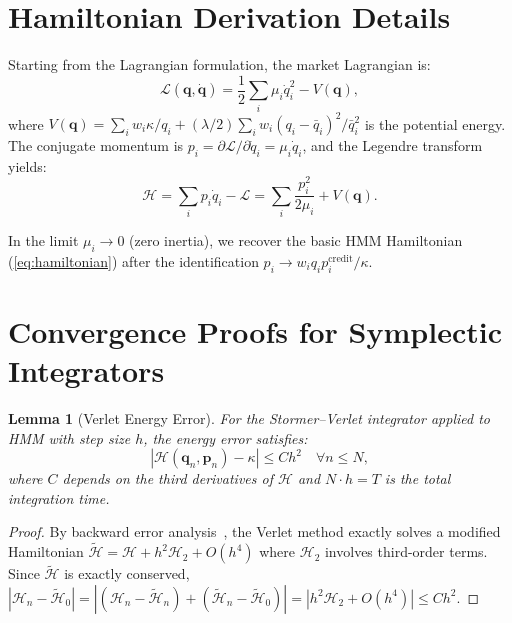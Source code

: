 \documentclass[11pt,twocolumn]{article}
\newtheorem{lemma}[theorem]{Lemma}
\begin{document}
\section{Hamiltonian Derivation Details}
\label{app:derivation}

Starting from the Lagrangian formulation, the market Lagrangian is:
\begin{equation}
\mathcal{L}(\bm{q}, \dot{\bm{q}}) = \frac{1}{2}\sum_i \mu_i \dot{q}_i^2 - V(\bm{q}),
\end{equation}
where $V(\bm{q}) = \sum_i w_i \kappa / q_i + (\lambda/2)\sum_i w_i(q_i - \bar{q}_i)^2/\bar{q}_i^2$ is the potential energy. The conjugate momentum is $p_i = \partial\mathcal{L}/\partial\dot{q}_i = \mu_i\dot{q}_i$, and the Legendre transform yields:
\begin{equation}
\mathcal{H} = \sum_i p_i\dot{q}_i - \mathcal{L} = \sum_i \frac{p_i^2}{2\mu_i} + V(\bm{q}).
\end{equation}

In the limit $\mu_i \to 0$ (zero inertia), we recover the basic HMM Hamiltonian (\ref{eq:hamiltonian}) after the identification $p_i \to w_i q_i p_i^{\text{credit}} / \kappa$.

\section{Convergence Proofs for Symplectic Integrators}
\label{app:convergence}

\begin{lemma}[Verlet Energy Error]
For the Stormer--Verlet integrator applied to HMM with step size $h$, the energy error satisfies:
\begin{equation}
|\mathcal{H}(\bm{q}_n, \bm{p}_n) - \kappa| \le C h^2 \quad \forall n \le N,
\end{equation}
where $C$ depends on the third derivatives of $\mathcal{H}$ and $N \cdot h = T$ is the total integration time.
\end{lemma}

\begin{proof}
By backward error analysis~\cite{hairer2006geometric}, the Verlet method exactly solves a modified Hamiltonian $\tilde{\mathcal{H}} = \mathcal{H} + h^2\mathcal{H}_2 + O(h^4)$ where $\mathcal{H}_2$ involves third-order terms. Since $\tilde{\mathcal{H}}$ is exactly conserved, $|\mathcal{H}_n - \tilde{\mathcal{H}}_0| = |(\mathcal{H}_n - \tilde{\mathcal{H}}_n) + (\tilde{\mathcal{H}}_n - \tilde{\mathcal{H}}_0)| = |h^2\mathcal{H}_2 + O(h^4)| \le Ch^2$.
\end{proof}
\end{document}
